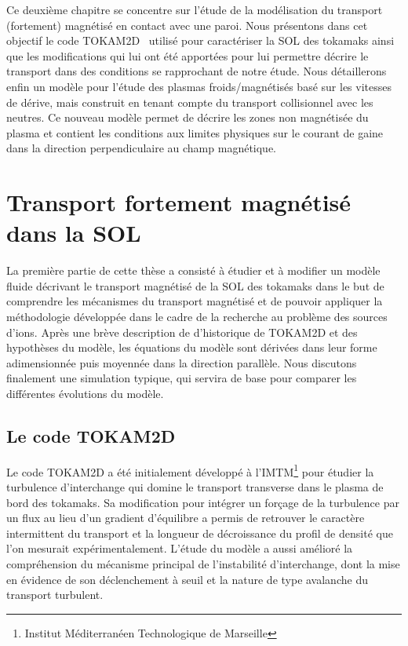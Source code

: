 \begin{refsection}
Ce deuxième chapitre se concentre sur l'étude de la modélisation du transport
(fortement) magnétisé en contact avec une paroi. Nous présentons dans cet objectif 
le code TOKAM2D~\cite{Sarazin} utilisé pour
caractériser la SOL des tokamaks ainsi que les modifications qui lui ont été
apportées pour lui permettre décrire le transport dans des conditions se
rapprochant de notre étude.
Nous détaillerons enfin un modèle pour l'étude des plasmas
froids/magnétisés basé sur les vitesses de dérive, mais construit en tenant
compte du transport collisionnel avec les neutres. Ce nouveau modèle permet
de décrire les zones non magnétisée du plasma et contient les conditions aux
limites physiques sur le courant de gaine dans la direction perpendiculaire au
champ magnétique.

\section{Transport fortement magnétisé dans la SOL}
La première partie de cette thèse a consisté à étudier et à modifier un modèle
fluide décrivant le transport magnétisé de la SOL des tokamaks dans le but de
comprendre les mécanismes du transport magnétisé et de pouvoir appliquer la
méthodologie développée dans le cadre de la recherche au problème des sources
d'ions. Après une brève description de d'historique de TOKAM2D et des hypothèses
du modèle, les équations du modèle sont dérivées dans leur forme adimensionnée
puis moyennée dans la direction parallèle. Nous discutons finalement une
simulation typique, qui servira de base pour comparer les différentes évolutions
du modèle.

\subsection{Le code TOKAM2D}

Le code TOKAM2D a été initialement développé à l'IMTM\footnote{Institut
Méditerranéen Technologique de Marseille} pour étudier la turbulence
d'interchange qui domine le transport transverse dans le plasma de bord des
tokamaks. Sa modification pour intégrer un forçage de la turbulence par un flux
au lieu d'un gradient d'équilibre a permis de retrouver le caractère
intermittent du transport et la longueur de décroissance du profil de densité
que l'on mesurait expérimentalement. L'étude du modèle a aussi amélioré la
compréhension du mécanisme principal de l'instabilité d'interchange, dont
la mise en évidence de son déclenchement à seuil et la nature de type avalanche
du transport turbulent.


\end{refsection}
